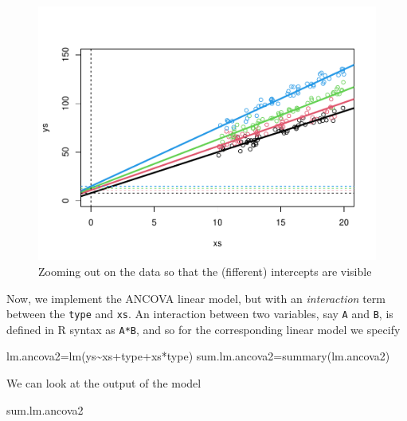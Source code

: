 \documentclass[
]{book}
\newenvironment{Shaded}{\begin{snugshade}}{\end{snugshade}}
\newcommand{\FunctionTok}[1]{\textcolor[rgb]{0.00,0.00,0.00}{#1}}
\newcommand{\NormalTok}[1]{#1}
\newcommand{\OtherTok}[1]{\textcolor[rgb]{0.56,0.35,0.01}{#1}}
\newcommand{\SpecialCharTok}[1]{\textcolor[rgb]{0.00,0.00,0.00}{#1}}
\begin{document}
\begin{figure}

{\centering \includegraphics[width=0.8\linewidth]{ECOMODbook_files/figure-latex/FCR-1} 

}

\caption{Zooming out on the data so that the (fifferent) intercepts are visible}\label{fig:FCR}
\end{figure}

Now, we implement the ANCOVA linear model, but with an \emph{interaction} term between the \texttt{type} and \texttt{xs}. An interaction between two variables, say \texttt{A} and \texttt{B}, is defined in R syntax as \texttt{A*B}, and so for the corresponding linear model we specify

\begin{Shaded}
\begin{Highlighting}[]
\NormalTok{lm.ancova2}\OtherTok{=}\FunctionTok{lm}\NormalTok{(ys}\SpecialCharTok{\textasciitilde{}}\NormalTok{xs}\SpecialCharTok{+}\NormalTok{type}\SpecialCharTok{+}\NormalTok{xs}\SpecialCharTok{*}\NormalTok{type)}
\NormalTok{sum.lm.ancova2}\OtherTok{=}\FunctionTok{summary}\NormalTok{(lm.ancova2)}
\end{Highlighting}
\end{Shaded}

We can look at the output of the model

\begin{Shaded}
\begin{Highlighting}[]
\NormalTok{sum.lm.ancova2}
\end{Highlighting}
\end{Shaded}
\end{document}
